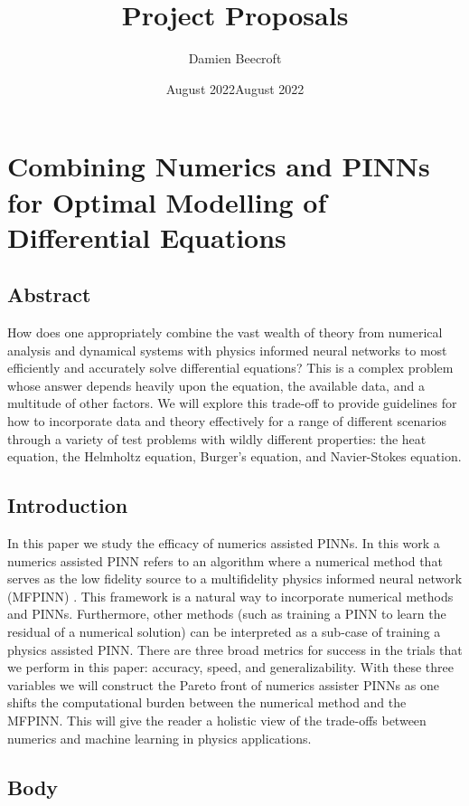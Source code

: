 \documentclass[12pt]{article}
\date{August 2022}
\title{Project Proposals}
\author{Damien Beecroft}
\date{August 2022}
\begin{document}
\maketitle
\section{Combining Numerics and PINNs for Optimal Modelling of Differential Equations}
\subsection{Abstract}
How does one appropriately combine the vast wealth of theory from numerical analysis 
and dynamical systems with physics informed neural networks to most efficiently and 
accurately solve differential equations? This is a complex problem whose answer depends 
heavily upon the equation, the available data, and a multitude of other factors. We
will explore this trade-off to provide guidelines for how to incorporate data and theory effectively 
for a range of different scenarios through a variety of test problems with wildly 
different properties: the heat equation, the Helmholtz equation, Burger's equation, and Navier-Stokes equation.

\subsection{Introduction}
In this paper we study the efficacy of numerics assisted PINNs. In this work a numerics assisted PINN refers to 
an algorithm where a numerical method that serves as the low fidelity source to a multifidelity physics informed neural network (MFPINN) \cite{mfpinns}.
This framework is a natural way to incorporate numerical methods and PINNs. Furthermore, other methods (such as training a PINN to 
learn the residual of a numerical solution) can be interpreted as a sub-case of training a physics assisted PINN.
There are three broad metrics for success in the trials that we perform in this paper: accuracy, speed, and generalizability.
With these three variables we will construct the Pareto front of numerics assister PINNs as one shifts the computational burden between
the numerical method and the MFPINN. This will give the reader a holistic view of the trade-offs between numerics and machine learning
in physics applications.

\subsection{Body}
\end{document}
